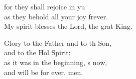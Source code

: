 \begin{psalmverse}
\begin{patverse}
for they shall rejoice in yu\Flex\\
as they behold all your joy frever.\Med\\
My spirit blesses the Lord, the grat King.

Glory to the Father and to th Son,\Med\\
and to the Hol Spirit:\\
as it was in the beginning, \pointup{\i}s now,\Med\\
and will be for ever. men.

  \end{patverse}
\end{psalmverse}

